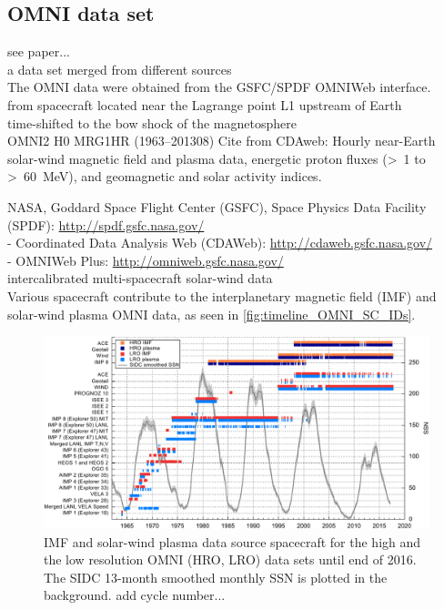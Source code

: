 \subsection{OMNI data set}
\label{sec:omni_data_set}

see paper...\\

a data set merged from different sources\\
The OMNI data \citep{King2005} were obtained from the GSFC/SPDF OMNIWeb interface.\\

from spacecraft located near the Lagrange point L1 upstream of Earth\\
time-shifted to the bow shock of the magnetosphere\\

OMNI2 H0 MRG1HR (1963--201308)
Cite from CDAweb: Hourly near-Earth solar-wind magnetic field and plasma data, energetic proton fluxes (>~1 to >~60~MeV), and geomagnetic and solar activity indices.

NASA, Goddard Space Flight Center (GSFC), Space Physics Data Facility (SPDF): \url{http://spdf.gsfc.nasa.gov/}\\	%
- Coordinated Data Analysis Web (CDAWeb): \url{http://cdaweb.gsfc.nasa.gov/}\\	%
- OMNIWeb Plus: \url{http://omniweb.gsfc.nasa.gov/}\\	%

intercalibrated multi-spacecraft solar-wind data\\
Various spacecraft contribute to the interplanetary magnetic field (IMF) and solar-wind plasma OMNI data, as seen in \autoref{fig:timeline_OMNI_SC_IDs}.\\
\begin{figure}[htb]
	\centering
	\includegraphics[width=\textwidth]{images/gnuplots/timeline_OMNI_SC_IDs.pdf}
	\caption{IMF and solar-wind plasma data source spacecraft for the high and the low resolution OMNI (HRO, LRO) data sets until end of 2016. The SIDC 13-month smoothed monthly SSN is plotted in the background. add cycle number...}
	\label{fig:timeline_OMNI_SC_IDs}
\end{figure}

